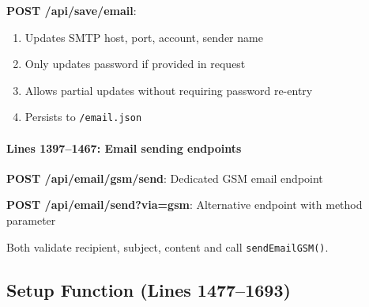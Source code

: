 \documentclass[11pt,a4paper]{article}
\begin{document}
\textbf{POST /api/save/email}:
\begin{enumerate}[leftmargin=*]
  \item Updates SMTP host, port, account, sender name
  \item Only updates password if provided in request
  \item Allows partial updates without requiring password re-entry
  \item Persists to \texttt{/email.json}
\end{enumerate}

\paragraph{Lines 1397--1467: Email sending endpoints}
\textbf{POST /api/email/gsm/send}: Dedicated GSM email endpoint

\textbf{POST /api/email/send?via=gsm}: Alternative endpoint with method parameter

Both validate recipient, subject, content and call \texttt{sendEmailGSM()}.

\subsection{Setup Function (Lines 1477--1693)}
\end{document}
